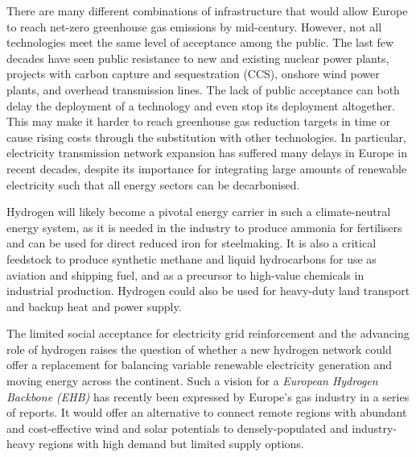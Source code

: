 There are many different combinations of infrastructure that would allow Europe
to reach net-zero greenhouse gas emissions by
mid-century.\cite{pickeringDiversityOptions2022} However, not all technologies
meet the same level of acceptance among the public. The last few decades have
seen public resistance to new and existing nuclear power plants, projects with
carbon capture and sequestration (CCS), onshore wind power plants, and overhead
transmission
lines.\cite{cohenRefocussingResearch2014a,bertschPublicAcceptance2016,boudetPublicPerceptions2019a}
The lack of public acceptance can both delay the deployment of a technology and
even stop its deployment altogether.\cite{batelSocialAcceptance2013a} This may
make it harder to reach greenhouse gas reduction targets in time or cause rising
costs through the substitution with other technologies. In particular,
electricity transmission network expansion has suffered many delays in Europe in
recent decades, despite its importance for integrating large amounts of
renewable electricity such that all energy sectors can be
decarbonised.\cite{schlachtbergerBenefitsCooperation2017,trondleTradeOffsGeographic2020}

Hydrogen will likely become a pivotal energy carrier in such a climate-neutral
energy system,\cite{hanleyRoleHydrogen2018,staffellRoleHydrogen2019a} as it is
needed in the industry to produce ammonia for fertilisers and can be used for
direct reduced iron for
steelmaking.\cite{wangGreeningAmmonia2018,voglPhasingOut2021} It is also a
critical feedstock to produce synthetic methane and liquid hydrocarbons for use
as aviation and shipping fuel, and as a precursor to high-value chemicals in
industrial production.\cite{lechtenbohmerDecarbonisingEnergy2016} Hydrogen could
also be used for heavy-duty land transport and backup heat and power
supply.\cite{kluschkeMarketDiffusion2019,doddsHydrogenFuel2015}

The limited social acceptance for electricity grid reinforcement and the
advancing role of hydrogen raises the question of whether a new hydrogen network
could offer a replacement for balancing variable renewable electricity
generation and moving energy across the
continent.\cite{caglayanRobustDesign2021} Such a vision for a \textit{European
Hydrogen Backbone (EHB)} has recently been expressed by Europe's gas industry in
a series of reports.
\cite{gasforclimateEuropeanHydrogen2020,gasforclimateEuropeanHydrogen2021,gasforclimateExtendingEuropean2021,gasforclimateEuropeanHydrogen2022}
It would offer an alternative to connect remote regions with abundant
and cost-effective wind and solar potentials to densely-populated and
industry-heavy regions with high demand but limited supply options.

